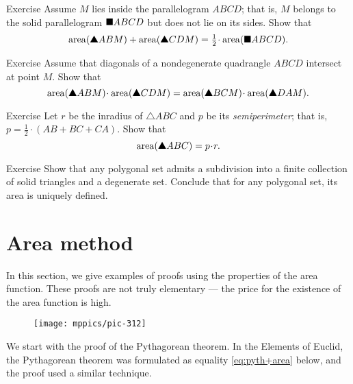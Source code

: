 {\begin{thm}{Exercise}\label{ex:half-parallelogram}
Assume $M$ lies inside the parallelogram $ABCD$;
that is, $M$ belongs to the solid parallelogram $\blacksquare ABCD$ but does not lie on its sides.
Show that
\[\area(\solidtriangle ABM)+\area(\solidtriangle CDM)
=\tfrac12\cdot \area(\solidsquare ABCD).\]
\end{thm}


\begin{thm}{Exercise}\label{ex:area-diag}
Assume that diagonals 
of a nondegenerate quadrangle $ABCD$ 
intersect at point $M$.
Show that 
\[\area(\solidtriangle ABM)\cdot\area(\solidtriangle CDM)
=
\area(\solidtriangle BCM)\cdot\area(\solidtriangle DAM).\]
 
\end{thm}

\begin{thm}{Exercise}\label{ex:area-inradius}
Let $r$ be the inradius of $\triangle ABC$
and $p$ be its {}\emph{semiperimeter}; 
that is, $p=\tfrac12\cdot(AB+BC+CA)$.
Show that
\[\area(\solidtriangle ABC)=p\cdot r.\]

\end{thm}



\begin{thm}{Exercise}\label{ex:subdivision}
Show that any polygonal set admits a subdivision into a finite collection of solid triangles and a degenerate set.
Conclude that for any polygonal set, its area is uniquely defined.
\end{thm}

\section{Area method}

In this section, we give examples of proofs using the properties of the area function.
These proofs are not truly elementary --- the price for the existence of the area function is high.

{

\begin{wrapfigure}{r}{20 mm}
\vskip-2mm
\centering
\texttt{[image: mppics/pic-312]}
\end{wrapfigure}

We start with the proof of the Pythagorean theorem.
In the Elements of Euclid, the Pythagorean theorem was formulated as equality  \ref{eq:pyth+area} below,
and the proof used a similar technique.

}}

